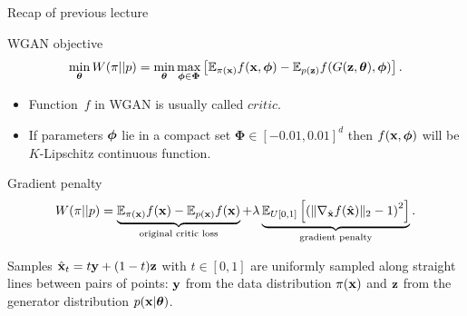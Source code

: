 

\begin{frame}
\titlepage
\end{frame}
\begin{frame}{Recap of previous lecture}
		\begin{block}{WGAN objective}
			\vspace{-0.5cm}
			\[
				\min_{\boldsymbol{\theta}} W(\pi || p) = \min_{\boldsymbol{\theta}} \max_{\boldsymbol{\phi} \in \boldsymbol{\Phi}} \left[ \mathbb{E}_{\pi(\mathbf{x})} f(\mathbf{x}, \boldsymbol{\phi})  - \mathbb{E}_{p(\mathbf{z})} f(G(\mathbf{z}, \boldsymbol{\theta}), \boldsymbol{\phi} )\right].
			\]
			\vspace{-0.5cm}
		\end{block}
		\begin{itemize}
			\item Function~$f$ in WGAN is usually called $\textit{critic}$.
			\item If parameters $\boldsymbol{\phi}$ lie in a compact set $\boldsymbol{\Phi} \in [-0.01, 0.01]^d$ then $f(\mathbf{x}, \boldsymbol{\phi})$ will be $K$-Lipschitz continuous function. 
		\end{itemize}
		\begin{block}{Gradient penalty}
			\vspace{-0.7cm}
			\[
				W(\pi || p) = \underbrace{\mathbb{E}_{\pi(\mathbf{x})} f(\mathbf{x})  - \mathbb{E}_{p(\mathbf{x})} f(\mathbf{x})}_{\text{original critic loss}} + \lambda \underbrace{\mathbb{E}_{U[0, 1]} \left[ \left( \| \nabla_{\hat{\mathbf{x}}} f(\hat{\mathbf{x}}) \|_2 - 1 \right) ^ 2\right]}_{\text{gradient penalty}}.
			\]
			\vspace{-0.7cm}
		\end{block}
		Samples $\hat{\mathbf{x}}_t = t \mathbf{y} + (1 - t) \mathbf{z}$ with $t \in [0, 1]$ are uniformly sampled along straight lines between pairs of points: $\mathbf{y}$ from the data distribution $\pi(\mathbf{x})$ and $\mathbf{z}$ from the generator distribution $p(\mathbf{x} | \boldsymbol{\theta})$.
\end{frame}
